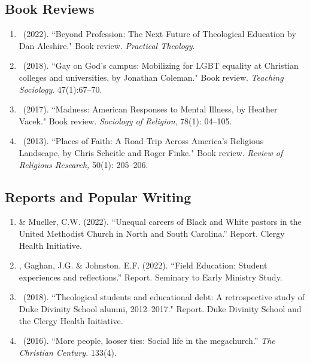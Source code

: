 \subsection*{Book Reviews}
\begin{enumerate} 
\item \Eagle\  (2022). ``Beyond Profession: The Next Future of Theological Education by Dan Aleshire." Book review.  \emph{Practical Theology}. 
	
\item \Eagle\  (2018). ``Gay on God’s campus: Mobilizing for LGBT equality at Christian colleges and universities, by Jonathan Coleman." Book review. \emph{Teaching Sociology}. 47(1):67--70. 

\item \Eagle\ (2017). ``Madness: American Responses to Mental Illness, by Heather Vacek." Book review. \emph{Sociology of Religion}, 78(1): 04--105. 

\item \Eagle\ (2013). ``Places of Faith: A Road Trip Across America's Religious Landscape, by Chris Scheitle and Roger Finke." Book review.  \emph{Review of Religious Research,} 50(1): 205--206. 
\end{enumerate}

\subsection*{Reports and Popular Writing}
\begin{enumerate} 
\item \Eagle \& Mueller, C.W. (2022). ``Unequal careers of Black and White pastors in the United Methodist Church in North and South Carolina.'' Report. Clergy Health Initiative.

\item \Eagle, Gaghan, J.G. \& Johnston. E.F. (2022). ``Field Education: Student experiences and reflections.'' Report. Seminary to Early Ministry Study.

\item \Eagle\ (2018). ``Theological students and educational debt: A retrospective study of Duke Divinity School alumni, 2012--2017." Report. Duke Divinity School and the Clergy Health Initiative.

\item \Eagle\ (2016). ``More people, looser ties: Social life in the megachurch.'' \emph{The Christian Century.} 133(4).
\end{enumerate}